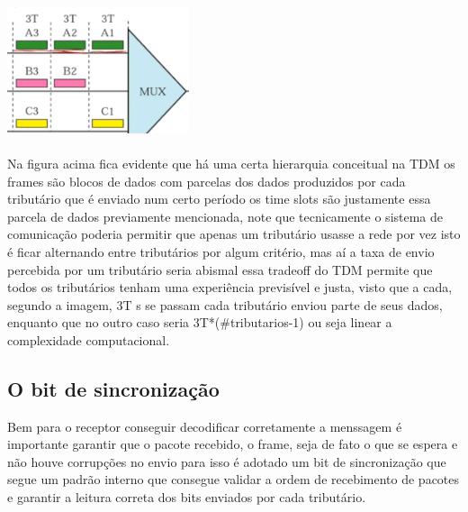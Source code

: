 \includegraphics[width=0.4\textwidth]{../assets/tsl.png}\cite{dc}
\\\\
Na figura acima fica evidente que há uma certa hierarquia conceitual na TDM os frames são blocos de dados com parcelas dos dados produzidos por cada tributário que é enviado num certo período
os time slots são justamente essa parcela de dados previamente mencionada, note que tecnicamente o sistema de comunicação poderia permitir que apenas um tributário usasse a rede por vez
isto é ficar alternando entre tributários por algum critério, mas aí a taxa de envio percebida por um tributário seria abismal essa tradeoff do TDM permite que todos os tributários tenham uma experiência
previsível e justa, visto que a cada, segundo a imagem, 3T s se passam cada tributário enviou parte de seus dados, enquanto que no outro caso seria 3T*(\#tributarios-1) ou seja
linear a complexidade computacional.

\subsection{O bit de sincronização}

Bem para o receptor conseguir decodificar corretamente a menssagem é importante garantir que o pacote recebido, o frame, seja de fato o que se espera e não houve
corrupções no envio para isso é adotado um bit de sincronização que segue um padrão interno que consegue validar a ordem de recebimento de pacotes e garantir a leitura correta
dos bits enviados por cada tributário.




